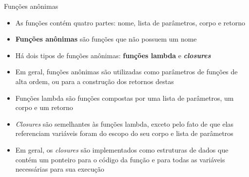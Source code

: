 \begin{frame}[fragile]{Funções anônimas}

    \begin{itemize}
        \item As funções contém quatro partes: nome, lista de parâmetros, corpo e retorno

        \item \textbf{Funções anônimas} são funções que não possuem um nome

        \item Há dois tipos de funções anônimas: \textbf{funções lambda} e 
            \textbf{\textit{closures}}

        \item Em geral, funções anônimas são utilizadas como parâmetros de funções de alta ordem,
            ou para a construção dos retornos destas

        \item Funções lambda são funções compostas por uma lista de parâmetros, um corpo e um
            retorno

        \item \textit{Closures} são semelhantes às funções lambda, exceto pelo fato de que elas
            referenciam variáveis foram do escopo do seu corpo e lista de parâmetros

        \item Em geral, os \textit{closures} são implementados como estruturas de dados que
            contém um ponteiro para o código da função e para todas as variáveis necessárias para
            sua execução
    \end{itemize}

\end{frame}

